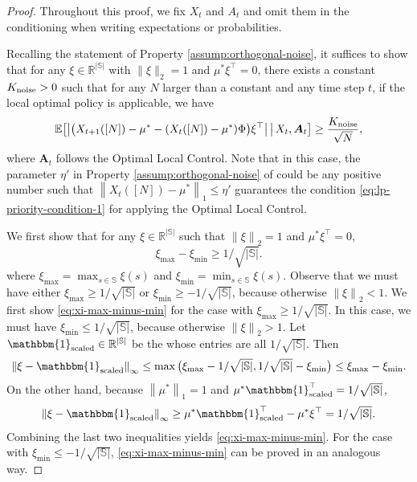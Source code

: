 \documentclass[11pt,letterpaper]{article}
\theoremstyle{plain}
\theoremstyle{definition}
\theoremstyle{remark}
\newcommand{\norm}[1]{\left\lVert#1\right\rVert}
\newcommand{\normplain}[1]{\lVert#1\rVert}
\newcommand{\Ebig}[1]{\mathbb{E}\big[#1\big]}
\newcommand{\givenbig}{\,\big|\,}
\newcommand{\R}{\mathbb{R}}
\newcommand{\absbig}[1]{\big\lvert#1\big\rvert}
\newcommand{\ve}[1]{\bm{#1}}
\newcommand{\vone}{\mathbbm{1}}
\newcommand{\veA}{\ve{A}}
\newcommand{\sspa}{\mathbb{S}}
\newcommand{\statdist}{\mu^*}
\newcommand{\radiusus}{\eta'}
\newcommand{\noiseortho}{K_{\textup{noise}}}
\newcommand{\ximax}{\xi_{\max}}
\newcommand{\ximin}{\xi_{\min}}
\newcommand{\vonescaled}{\vone_{\textup{scaled}}}
\begin{document}
\begin{proof}
    Throughout this proof, we fix $X_t$ and $A_t$ and omit them in the conditioning when writing expectations or probabilities. 

    Recalling the statement of Property \ref{assump:orthogonal-noise}, it suffices to show that for any $\xi \in \R^{|\sspa|}$ with $\normplain{\xi}_2 = 1$ and $\statdist \xi^\top = 0$, 
    there exists a constant $\noiseortho > 0$ such that 
    for any $N$ larger than a constant and any time step $t$, if the local optimal policy is applicable, we have
    \begin{equation}
        \label{eq:pf-assumption-6-helper-lemma:goal}
        \Ebig{\absbig{\big(X_{t+1}([N]) - \statdist - (X_t([N]) - \statdist)\Phi \big)  \xi^\top } \givenbig X_t, \veA_t} \geq \frac{\noiseortho}{\sqrt{N}}, 
    \end{equation}
    where $\veA_t$ follows the Optimal Local Control. 
    Note that in this case, the parameter $\radiusus$ in Property \ref{assump:orthogonal-noise} of  could be any positive number such that $\norm{X_t([N]) - \statdist}_1 \leq \radiusus$ guarantees the condition \eqref{eq:lp-priority-condition-1} for applying the Optimal Local Control. 
    
    
    We first show that for any $\xi \in \R^{|\sspa|}$ such that $\norm{\xi}_2 = 1$ and $\statdist \xi^\top = 0$,
    \begin{equation}
        \label{eq:xi-max-minus-min}
        \ximax - \ximin \geq 1/\sqrt{|\sspa|}.
    \end{equation}
    where $\ximax = \max_{s\in\sspa} \xi(s)$ and $\ximin = \min_{s\in\sspa} \xi(s)$. 
    Observe that we must have either $\ximax \geq 1/\sqrt{|\sspa|}$ or $\ximin \geq - 1/\sqrt{|\sspa|}$, because otherwise $\norm{\xi}_2 < 1$.  
    We first show \eqref{eq:xi-max-minus-min} for the case with $\ximax \geq 1/\sqrt{|\sspa|}$. In this case, we must have $\ximin \leq 1/\sqrt{|\sspa|}$, because otherwise $\norm{\xi}_2 > 1$. 
    Let $\vonescaled \in \R^{|\sspa|}$ be the whose entries are all $1/\sqrt{|\sspa|}$. Then 
    \[
        \norm{\xi -\vonescaled}_\infty \leq \max\big(\ximax - 1/\sqrt{|\sspa|}, 1/\sqrt{|\sspa|} - \ximin\big) \leq \ximax - \ximin. 
    \]
    On the other hand, because $\norm{\statdist}_1 = 1$ and $\statdist \vonescaled^\top = 1/\sqrt{|\sspa|}$, 
    \[
         \norm{\xi - \vonescaled}_\infty \geq \statdist \vonescaled^\top - \statdist \xi^\top = 1/\sqrt{|\sspa|}. 
    \]
    Combining the last two inequalities yields \eqref{eq:xi-max-minus-min}. For the case with $\ximin \leq -1/\sqrt{|\sspa|}$, \eqref{eq:xi-max-minus-min} can be proved in an analogous way.


\end{proof}
\end{document}
